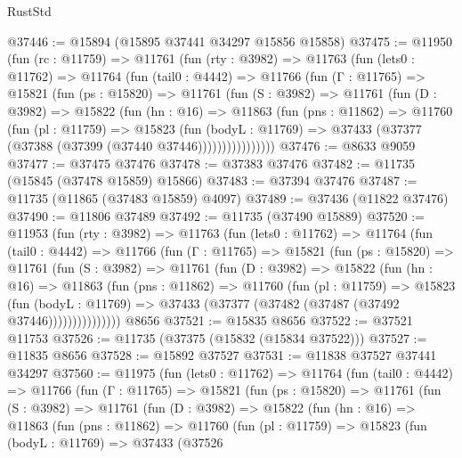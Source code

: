 \begin{lexlean}{RustStd}
\begin{coremodule}
@37446 := @15894 (@15895 @37441 @34297 @15856 @15858)
@37475 := @11950
    (fun (rc : @11759) =>
    @11761
      (fun (rty : @3982) =>
      @11763
        (fun (lets0 : @11762) =>
        @11764
          (fun (tail0 : @4442) =>
          @11766
            (fun (Γ : @11765) =>
            @15821
              (fun (ps : @15820) =>
              @11761
                (fun (S : @3982) =>
                @11761
                  (fun (D : @3982) =>
                  @15822
                    (fun (hn : @16) =>
                    @11863
                      (fun (pns : @11862) =>
                      @11760
                        (fun (pl : @11759) =>
                        @15823
                          (fun (bodyL : @11769) =>
                          @37433 (@37377 (@37388 (@37399 (@37440 @37446))))))))))))))))
@37476 := @8633 @9059
@37477 := @37475 @37476
@37478 := @37383 @37476
@37482 := @11735 (@15845 (@37478 @15859) @15866)
@37483 := @37394 @37476
@37487 := @11735 (@11865 (@37483 @15859) @4097)
@37489 := @37436 (@11822 @37476)
@37490 := @11806 @37489
@37492 := @11735 (@37490 @15889)
@37520 := @11953
    (fun (rty : @3982) =>
    @11763
      (fun (lets0 : @11762) =>
      @11764
        (fun (tail0 : @4442) =>
        @11766
          (fun (Γ : @11765) =>
          @15821
            (fun (ps : @15820) =>
            @11761
              (fun (S : @3982) =>
              @11761
                (fun (D : @3982) =>
                @15822
                  (fun (hn : @16) =>
                  @11863
                    (fun (pns : @11862) =>
                    @11760
                      (fun (pl : @11759) =>
                      @15823
                        (fun (bodyL : @11769) =>
                        @37433 (@37377 (@37482 (@37487 (@37492 @37446)))))))))))))))
    @8656
@37521 := @15835 @8656
@37522 := @37521 @11753
@37526 := @11735 (@37375 (@15832 (@15834 @37522)))
@37527 := @11835 @8656
@37528 := @15892 @37527
@37531 := @11838 @37527 @37441 @34297
@37560 := @11975
    (fun (lets0 : @11762) =>
    @11764
      (fun (tail0 : @4442) =>
      @11766
        (fun (Γ : @11765) =>
        @15821
          (fun (ps : @15820) =>
          @11761
            (fun (S : @3982) =>
            @11761
              (fun (D : @3982) =>
              @15822
                (fun (hn : @16) =>
                @11863
                  (fun (pns : @11862) =>
                  @11760
                    (fun (pl : @11759) =>
                    @15823
                      (fun (bodyL : @11769) =>
                      @37433
                        (@37526

\end{coremodule}
\end{lexlean}
